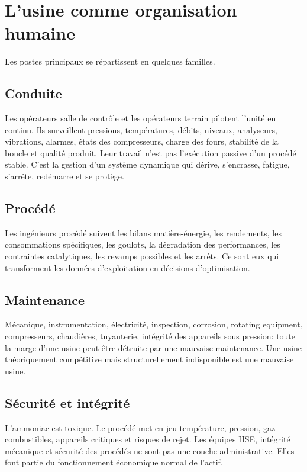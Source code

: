 \documentclass[11pt]{article}
\begin{document}
\section{L'usine comme organisation humaine}

Les postes principaux se répartissent en quelques familles.

\subsection{Conduite}

Les opérateurs salle de contrôle et les opérateurs terrain pilotent l'unité en continu. Ils surveillent pressions, températures, débits, niveaux, analyseurs, vibrations, alarmes, états des compresseurs, charge des fours, stabilité de la boucle et qualité produit. Leur travail n'est pas l'exécution passive d'un procédé stable. C'est la gestion d'un système dynamique qui dérive, s'encrasse, fatigue, s'arrête, redémarre et se protège.

\subsection{Procédé}

Les ingénieurs procédé suivent les bilans matière-énergie, les rendements, les consommations spécifiques, les goulots, la dégradation des performances, les contraintes catalytiques, les revamps possibles et les arrêts. Ce sont eux qui transforment les données d'exploitation en décisions d'optimisation.

\subsection{Maintenance}

Mécanique, instrumentation, électricité, inspection, corrosion, rotating equipment, compresseurs, chaudières, tuyauterie, intégrité des appareils sous pression: toute la marge d'une usine peut être détruite par une mauvaise maintenance. Une usine théoriquement compétitive mais structurellement indisponible est une mauvaise usine.

\subsection{Sécurité et intégrité}

L'ammoniac est toxique. Le procédé met en jeu température, pression, gaz combustibles, appareils critiques et risques de rejet. Les équipes HSE, intégrité mécanique et sécurité des procédés ne sont pas une couche administrative. Elles font partie du fonctionnement économique normal de l'actif.
\end{document}
